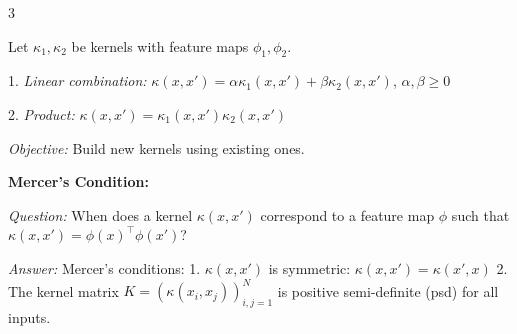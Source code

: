 \documentclass[landscape, 10pt]{article}
\begin{document}
\begin{multicols*}{3}
{Let $\kappa_1, \kappa_2$ be kernels with feature maps $\phi_1, \phi_2$.

1. \textit{Linear combination:}  
   $\kappa(x, x') = \alpha \kappa_1(x, x') + \beta \kappa_2(x, x')$, $\alpha, \beta \geq 0$  

2. \textit{Product:}  
   $\kappa(x, x') = \kappa_1(x, x') \kappa_2(x, x')$  

\textit{Objective:} Build new kernels using existing ones.  

\item \textbf{Mercer's Condition:}

\textit{Question:} When does a kernel $\kappa(x, x')$ correspond to a feature map $\phi$ such that $\kappa(x, x') = \phi(x)^\top \phi(x')$?  

\textit{Answer:} Mercer’s conditions:  
1. $\kappa(x, x')$ is symmetric: $\kappa(x, x') = \kappa(x', x)$  
2. The kernel matrix $K = (\kappa(x_i, x_j))_{i,j=1}^N$ is positive semi-definite (psd) for all inputs.  

}
\end{multicols*}
\end{document}
